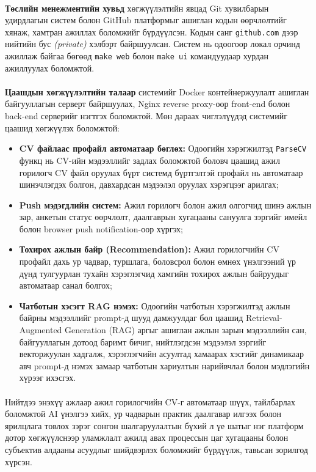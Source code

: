 \paragraph{}
\textbf{Төслийн менежментийн хувьд} хөгжүүлэлтийн явцад Git хувилбарын удирдлагын систем болон GitHub платформыг ашиглан кодын өөрчлөлтийг хянаж, хамтран ажиллах боломжийг бүрдүүлсэн. Кодын санг \texttt{github.com} дээр нийтийн бус \textit{(private)} хэлбэрт байршуулсан. Систем нь одоогоор локал орчинд ажиллаж байгаа бөгөөд \texttt{make web} болон \texttt{make ui} командуудаар хурдан ажиллуулах боломжтой.

\paragraph{}
\textbf{Цаашдын хөгжүүлэлтийн талаар} системийг Docker контейнержуулалт ашиглан байгууллагын серверт байршуулах, Nginx reverse proxy-оор front-end болон back-end серверийг нэгтгэх боломжтой. Мөн дараах чиглэлүүдэд системийг цаашид хөгжүүлэх боломжтой:

\begin{itemize}
    \item \textbf{CV файлаас профайл автоматаар бөглөх:} Одоогийн хэрэгжилтэд \texttt{ParseCV} функц нь CV-ийн мэдээллийг задлах боломжтой боловч цаашид ажил горилогч CV файл оруулах бүрт системд бүртгэлтэй профайл нь автоматаар шинэчлэгдэх болгон, давхардсан мэдээлэл оруулах хэрэгцээг арилгах;
    \item \textbf{Push мэдэгдлийн систем:} Ажил горилогч болон ажил олгогчид шинэ ажлын зар, анкетын статус өөрчлөлт, даалгаврын хугацааны сануулга зэргийг имейл болон browser push notification-оор хүргэх;
    \item \textbf{Тохирох ажлын байр (Recommendation):} Ажил горилогчийн CV профайл дахь ур чадвар, туршлага, боловсрол болон өмнөх үнэлгээний үр дүнд тулгуурлан тухайн хэрэглэгчид хамгийн тохирох ажлын байруудыг автоматаар санал болгох;
    \item \textbf{Чатботын хэсэгт RAG нэмэх:} Одоогийн чатботын хэрэгжилтэд ажлын байрны мэдээллийг prompt-д шууд дамжуулдаг бол цаашид Retrieval-Augmented Generation (RAG) аргыг ашиглан ажлын зарын мэдээллийн сан, байгууллагын дотоод баримт бичиг, нийтлэгдсэн мэдээлэл зэргийг векторжуулан хадгалж, хэрэглэгчийн асуултад хамаарах хэсгийг динамикаар авч prompt-д нэмэх замаар чатботын хариултын нарийвчлал болон мэдлэгийн хүрээг ихэсгэх.
\end{itemize}

\paragraph{}
Нийтдээ энэхүү ажлаар ажил горилогчийн CV-г автоматаар шүүх, тайлбарлах боломжтой AI үнэлгээ хийх, ур чадварын практик даалгавар илгээх болон ярилцлага товлох зэрэг сонгон шалгаруулалтын бүхий л үе шатыг нэг платформ дотор хөгжүүлснээр уламжлалт ажилд авах процессын цаг хугацааны болон субъектив алдааны асуудлыг шийдвэрлэх боломжийг бүрдүүлж, тавьсан зорилгод хүрсэн.